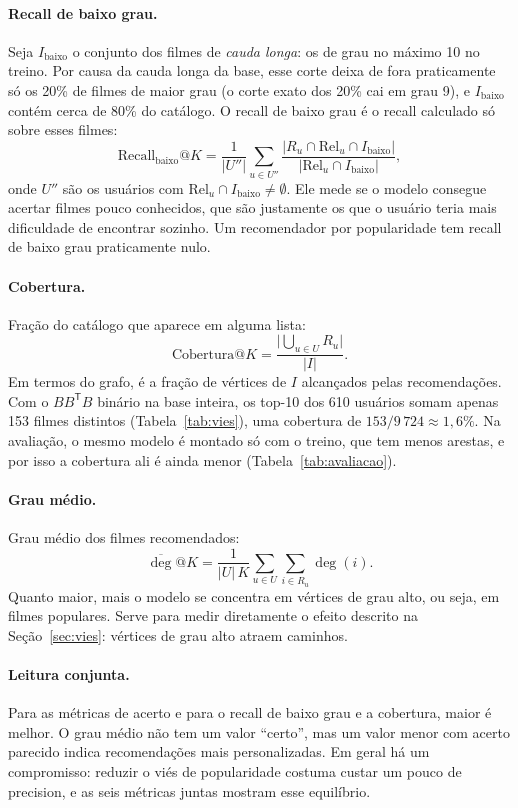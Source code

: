 \documentclass[12pt,a4paper]{article}
\theoremstyle{definition}
\begin{document}
\paragraph{Recall de baixo grau.}
Seja $I_{\text{baixo}}$ o conjunto dos filmes de \emph{cauda longa}: os de
grau no máximo 10 no treino. Por causa da cauda longa da base, esse corte
deixa de fora praticamente só os 20\% de filmes de maior grau (o corte
exato dos 20\% cai em grau 9), e $I_{\text{baixo}}$ contém cerca de 80\%
do catálogo. O recall de baixo grau é o recall calculado só sobre esses
filmes:
\[
  \mathrm{Recall}_{\text{baixo}}\mathrm{@}K = \frac{1}{|U''|} \sum_{u \in U''}
  \frac{|R_u \cap \mathrm{Rel}_u \cap I_{\text{baixo}}|}
       {|\mathrm{Rel}_u \cap I_{\text{baixo}}|},
\]
onde $U''$ são os usuários com $\mathrm{Rel}_u \cap I_{\text{baixo}} \neq
\emptyset$. Ele mede se o modelo consegue acertar filmes pouco conhecidos,
que são justamente os que o usuário teria mais dificuldade de encontrar
sozinho. Um recomendador por popularidade tem recall de baixo grau
praticamente nulo.

\paragraph{Cobertura.}
Fração do catálogo que aparece em alguma lista:
\[
  \mathrm{Cobertura@}K = \frac{\bigl|\bigcup_{u \in U} R_u\bigr|}{|I|}.
\]
Em termos do grafo, é a fração de vértices de $I$ alcançados pelas
recomendações. Com o $BB^{\mathsf T}B$ binário na base inteira, os top-10
dos 610 usuários somam apenas 153 filmes distintos (Tabela~\ref{tab:vies}),
uma cobertura de $153/9\,724 \approx 1{,}6\%$. Na avaliação, o mesmo modelo
é montado só com o treino, que tem menos arestas, e por isso a cobertura
ali é ainda menor (Tabela~\ref{tab:avaliacao}).

\paragraph{Grau médio.}
Grau médio dos filmes recomendados:
\[
  \overline{\deg}\mathrm{@}K = \frac{1}{|U|\,K} \sum_{u \in U} \sum_{i \in R_u} \deg(i).
\]
Quanto maior, mais o modelo se concentra em vértices de grau alto, ou
seja, em filmes populares. Serve para medir diretamente o efeito descrito
na Seção~\ref{sec:vies}: vértices de grau alto atraem caminhos.

\paragraph{Leitura conjunta.}
Para as métricas de acerto e para o recall de baixo grau e a cobertura,
maior é melhor. O grau médio não tem um valor ``certo'', mas um valor
menor com acerto parecido indica recomendações mais personalizadas. Em
geral há um compromisso: reduzir o viés de popularidade costuma custar um
pouco de precision, e as seis métricas juntas mostram esse equilíbrio.
\end{document}
